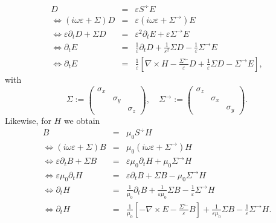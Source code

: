 \documentclass{article}
\newcommand{\assign}{:=}
\begin{document}
\begin{eqnarray*}
  D & = & \varepsilon S^{\div} E\\
  \Leftrightarrow (i \omega \varepsilon + \Sigma) D & = & \varepsilon (i
  \omega \varepsilon + \Sigma^{\rightarrow}) E\\
  \Leftrightarrow \varepsilon \partial_t D + \Sigma D & = & \varepsilon^2
  \partial_t E + \varepsilon \Sigma^{\rightarrow} E\\
  \Leftrightarrow \partial_t E & = & \frac{1}{\varepsilon} \partial_t D +
  \frac{1}{\varepsilon^2} \Sigma D - \frac{1}{\varepsilon}
  \Sigma^{\rightarrow} E\\
  \Leftrightarrow \partial_t E & = & \frac{1}{\varepsilon} \left[ \nabla
  \times H - \frac{\Sigma^{\leftarrow}}{\varepsilon} D + \frac{1}{\varepsilon}
  \Sigma D - \Sigma^{\rightarrow} E \right],
\end{eqnarray*}
with
\[ \Sigma \assign \left(\begin{array}{ccc}
     \sigma_x &  & \\
     & \sigma_y & \\
     &  & \sigma_z
   \end{array}\right), \quad \Sigma^{\rightarrow} \assign
   \left(\begin{array}{ccc}
     \sigma_z &  & \\
     & \sigma_x & \\
     &  & \sigma_y
   \end{array}\right) . \]
Likewise, for $H$ we obtain
\begin{eqnarray*}
  B & = & \mu_0 S^{\div} H\\
  \Leftrightarrow (i \omega \varepsilon + \Sigma) B & = & \mu_0 (i \omega
  \varepsilon + \Sigma^{\rightarrow}) H\\
  \Leftrightarrow \varepsilon \partial_t B + \Sigma B & = & \varepsilon \mu_0
  \partial_t H + \mu_0 \Sigma^{\rightarrow} H\\
  \Leftrightarrow \varepsilon \mu_0 \partial_t H & = & \varepsilon \partial_t
  B + \Sigma B - \mu_0 \Sigma^{\rightarrow} H\\
  \Leftrightarrow \partial_t H & = & \frac{1}{\mu_0} \partial_t B +
  \frac{1}{\varepsilon \mu_0} \Sigma B - \frac{1}{\varepsilon}
  \Sigma^{\rightarrow} H\\
  \Leftrightarrow \partial_t H & = & \frac{1}{\mu_0} \left[ - \nabla \times E
  - \frac{\Sigma^{\leftarrow}}{\varepsilon} B \right] + \frac{1}{\varepsilon
  \mu_0} \Sigma B - \frac{1}{\varepsilon} \Sigma^{\rightarrow} H.
\end{eqnarray*}
\end{document}

